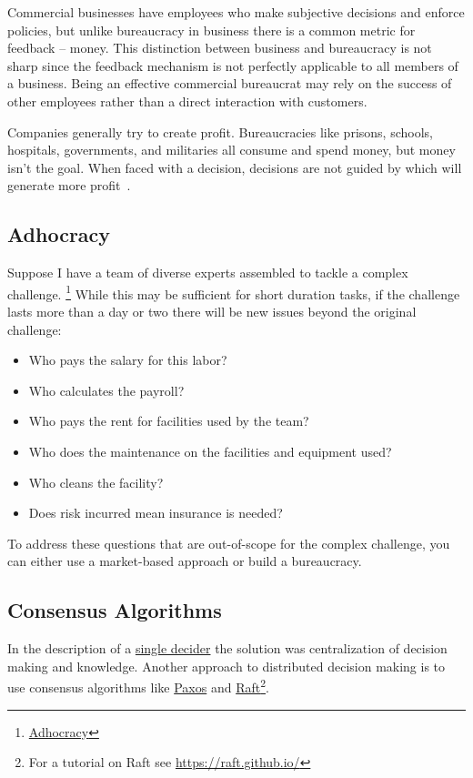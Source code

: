 Commercial businesses have employees who make subjective decisions and enforce policies, but unlike bureaucracy in business there is a common metric for feedback -- money. This distinction between business and bureaucracy is not sharp since the feedback mechanism is not perfectly applicable to all members of a business. Being an effective commercial bureaucrat may rely on the success of other employees rather than a direct interaction with customers.

Companies generally try to create profit. 
Bureaucracies like prisons, schools, hospitals, governments, and militaries all consume and spend money, but money isn't the goal. When faced with a decision, decisions are not guided by which will generate more profit~\cite{2012_Wilson}.

\subsection*{Adhocracy}

Suppose I have a team of diverse experts assembled to tackle a complex challenge.
\footnote{\href{https://en.wikipedia.org/wiki/Adhocracy}{Adhocracy}}
While this may be sufficient for short duration tasks, if the challenge lasts more than a day or two there will be new issues beyond the original challenge:

\begin{itemize}
    \item Who pays the salary for this labor?
    \item Who calculates the payroll?
    \item Who pays the rent for facilities used by the team?
    \item Who does the maintenance on the facilities and equipment used?
    \item Who cleans the facility?
    \item Does risk incurred mean insurance is needed?
\end{itemize}
To address these questions that are out-of-scope for the complex challenge, you can either use a market-based approach or build a bureaucracy. 

\subsection*{Consensus Algorithms}

In the description of a \hyperref[sec:single-decider]{single decider}
the solution was centralization of decision making and knowledge. Another approach to distributed decision making is to use consensus algorithms like \href{https://en.wikipedia.org/wiki/Paxos_(computer_science)}{Paxos} and \href{https://en.wikipedia.org/wiki/Raft_(algorithm)}{Raft}\footnote{For a tutorial on Raft see \href{https://raft.github.io/}{https://raft.github.io/}}.


